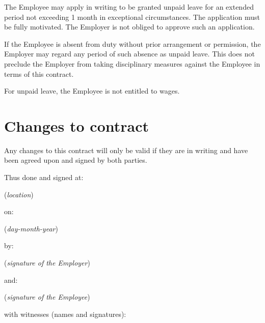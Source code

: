 \documentclass[a4paper,11pt]{article}
\begin{document}
\para The Employee may apply in writing to be granted unpaid leave for an
extended period not exceeding 1 month in exceptional circumstances. The
application must be fully motivated. The Employer is not obliged to approve
such an application.

\para If the Employee is absent from duty without prior arrangement or
permission, the Employer may regard any period of such absence as unpaid leave.
This does not preclude the Employer from taking disciplinary measures against
the Employee in terms of this contract.

\para For unpaid leave, the Employee is not entitled to wages.

\section{Changes to contract}
\label{changes}

\para Any changes to this contract will only be valid if they are in writing
and have been agreed upon and signed by both parties.

\pagebreak %

\rfoot{}

\begin{center}
  Thus done and signed at:

  \vspace{0.5cm}


  (\textit{location})

  \vspace{0.5cm}

  on:

  \vspace{0.5cm}


  (\textit{day-month-year})

  \vspace{0.5cm}

  by:

  \vspace{0.5cm}


  (\textit{signature of the Employer})

  \vspace{0.5cm}

  and:

  \vspace{0.5cm}


  (\textit{signature of the Employee})

  \vspace{0.5cm}

  with witnesses (names and signatures):

  \vspace{0.5cm}


  \vspace{0.5cm}


\end{center}
\end{document}
